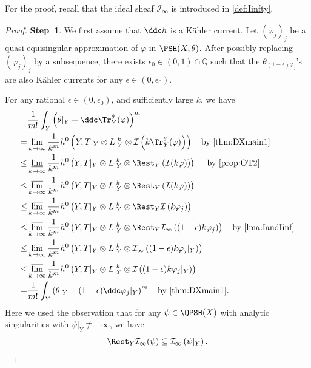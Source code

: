 For the proof, recall that the ideal sheaf $\mathcal{I}_{\infty}$ is introduced in \cref{def:Iinfty}.
\begin{proof}
\textbf{Step~1}. We first assume that $\ddc h$ is a Kähler current.
Let $(\varphi_j)_j$ be a quasi-equisingular approximation of $\varphi$ in $\PSH(X,\theta)$.
After possibly replacing $(\varphi_j)_j$ by a subsequence, there exists $\epsilon_0 \in (0,1)\cap \mathbb{Q}$ such that the $\theta_{(1-\epsilon) \varphi_j}$'s are also Kähler currents for any $\epsilon \in (0,\epsilon_0)$.

For any rational $\epsilon\in (0,\epsilon_0)$, and sufficiently large $k$, we have
\[
\begin{aligned}
&\frac{1}{m!}\int_Y \left(\theta|_Y+\ddc\Tr_Y^{\theta}(\varphi)\right)^m \\
=& \lim_{k \to \infty} \frac{1}{k^m} h^0\left(Y, T|_Y\otimes L|_Y^k\otimes \mathcal{I}\left(k\Tr_Y^{\theta}(\varphi)\right)\right) \quad \textup{by \cref{thm:DXmain1}}\\
\leq & \varliminf_{k \to \infty} \frac{1}{k^m} h^0\left(Y, T|_Y\otimes L|_Y^k\otimes \Rest_Y\left(\mathcal{I}(k\varphi)\right)\right) \quad \textup{ by \cref{prop:OT2}}\\
\leq & \varlimsup_{k \to \infty} \frac{1}{k^m} h^0\left(Y, T|_Y\otimes L|_Y^k\otimes \Rest_Y\left(\mathcal{I}(k\varphi)\right)\right)\\
\leq & \varlimsup_{k \to \infty} \frac{1}{k^m} h^0\left(Y, T|_Y\otimes L|_Y^k\otimes \Rest_Y\mathcal{I}\left(k\varphi_j\right)\right) \\
\leq & \varlimsup_{k \to \infty} \frac{1}{k^m} h^0\left(Y, T|_Y\otimes L|_Y^k\otimes \Rest_Y\mathcal{I}_{\infty}\left((1-\epsilon )k\varphi_j\right)\right)  \quad \textup{by \cref{lma:IandIinf}}\\
\leq & \varlimsup_{k \to \infty} \frac{1}{k^m} h^0\left(Y, T|_Y\otimes L|_Y^k\otimes \mathcal{I}_{\infty}\left((1-\epsilon )k\varphi_j|_Y\right)\right)\\
\leq & \varlimsup_{k \to \infty} \frac{1}{k^m} h^0\left(Y, T|_Y\otimes L|_Y^k\otimes \mathcal{I}\left((1-\epsilon) k\varphi_j|_Y\right) \right)\\
= & \frac{1}{m!} \int_Y \left(\theta|_Y+(1-\epsilon)\ddc\varphi_j|_Y\right)^m\quad \textup{by \cref{thm:DXmain1}}.
\end{aligned}
\]
Here we used the observation that for any $\psi\in \QPSH(X)$ with analytic singularities with $\psi|_Y\not\equiv -\infty$, we have
\[
\Rest_Y \mathcal{I}_{\infty}(\psi)\subseteq \mathcal{I}_{\infty}\left(\psi|_Y\right).
\]


\end{proof}
